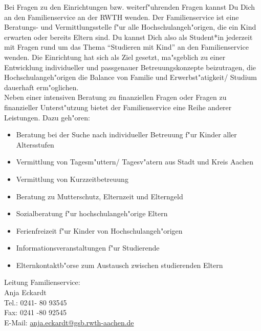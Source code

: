 \begin{artikel}{}
Bei Fragen zu den Einrichtungen bzw. weiterf"uhrenden Fragen kannst Du Dich an den Familienservice an der RWTH wenden. Der Familienservice ist eine Beratungs- und Vermittlungsstelle f"ur alle Hochschulangeh"origen, die ein Kind erwarten oder bereits Eltern sind. Du kannst Dich also als Student*in jederzeit mit Fragen rund um das Thema "`Studieren mit Kind"' an den Familienservice wenden. Die Einrichtung hat sich als Ziel gesetzt, ma"sgeblich zu einer Entwicklung individueller und passgenauer Betreuungskonzepte beizutragen, die Hochschulangeh"origen die Balance von Familie und Erwerbst"atigkeit/ Studium dauerhaft erm"oglichen.\\
Neben einer intensiven Beratung zu finanziellen Fragen oder Fragen zu finanzieller Unterst"utzung bietet der Familienservice eine Reihe anderer Leistungen. Dazu geh"oren:
\begin{itemize}
\item Beratung bei der Suche nach individueller Betreuung f"ur Kinder aller Altersstufen
\item Vermittlung von Tagesm"uttern/ Tagesv"atern aus Stadt und Kreis Aachen
\item Vermittlung von Kurzzeitbetreuung
\item Beratung zu Mutterschutz, Elternzeit und Elterngeld
\item Sozialberatung f"ur hochschulangeh"orige Eltern
\item Ferienfreizeit f"ur Kinder von Hochschulangeh"origen
\item Informationsveranstaltungen f"ur Studierende
\item Elternkontaktb"orse zum Austausch zwischen studierenden Eltern
\end{itemize}

Leitung Familienservice:\\
Anja Eckardt\\
Tel.: 0241- 80 93545\\
Fax: 0241 -80 92545\\
E-Mail: \href{mailto:anja.eckardt@gsb.rwth-aachen.de}{anja.eckardt@gsb.rwth-aachen.de}\\



\end{artikel}

